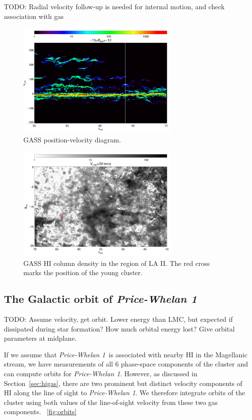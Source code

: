 \documentclass[twocolumn]{aastex62}
\newcommand{\todo}[1]{{\color{red} TODO: #1}}
\newcommand{\sectionname}{Section}
\newcommand{\hi}{H{\footnotesize I} }
\newcommand{\clustername}{\textsl{Price-Whelan 1}}
\begin{document}
\todo{Radial velocity follow-up is needed for internal motion, and check association with gas}


\begin{figure}
\centering
\includegraphics[width=8cm]{gass_vlsrmlon.pdf}
\caption{GASS position-velocity diagram.}
\label{fig_gass}
\end{figure}

\begin{figure}
\centering
\includegraphics[width=8cm]{gass_mlatmlon.pdf}
\caption{GASS \hi column density in the region of LA II. The red cross marks the position
of the young cluster.}
\label{fig_gass}
\end{figure}


\subsection{The Galactic orbit of \clustername}
\label{sec:orbit}

\todo{Assume velocity, get orbit. Lower energy than LMC, but expected if dissipated during star formation? How much orbital energy lost? Give orbital parameters at midplane.}

If we assume that \clustername\ is associated with nearby \hi in the Magellanic stream, we have measurements of all 6 phase-space components of the cluster and can compute orbits for \clustername.
However, as discussed in \sectionname~\ref{sec:higas}, there are two prominent but distinct velocity components of \hi along the line of sight to \clustername.
We therefore integrate orbits of the cluster using both values of the line-of-sight velocity from these two gas components.
\figurename~\ref{fig:orbits}
\end{document}
